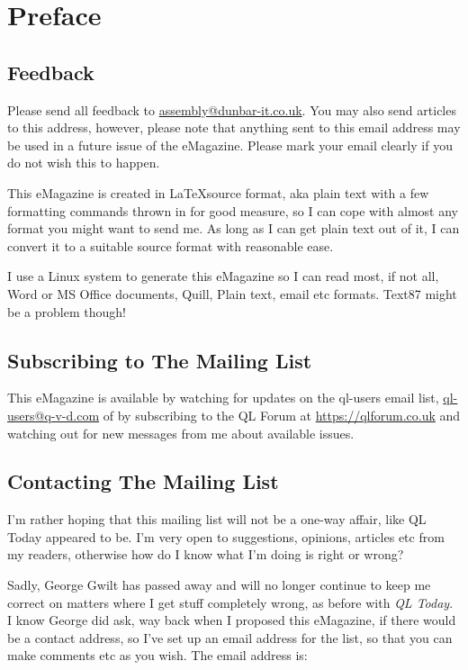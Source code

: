 \chapter{Preface}
\section{Feedback}\label{section: feedback}
Please send all feedback to \url{assembly@dunbar-it.co.uk}. You may also send articles to
this address, however, please note that anything sent to this email address may be used in a future issue of the eMagazine. Please mark your email clearly if you do not wish this to happen.

This eMagazine is created in \LaTeX  source format, aka plain text with a few formatting commands thrown in for good measure, so I can cope with almost any format you might want to send me. As long as I can get plain text out of it, I can convert it to a suitable source format with reasonable ease. 

I use a Linux system to generate this eMagazine so I can read most, if not all, Word or MS Office documents, Quill, Plain text, email etc formats. Text87 might be a problem though!

\section{Subscribing to The Mailing List}
This eMagazine is available by watching for updates on the ql-users email list, \url{ql-users@q-v-d.com} of by subscribing to the QL Forum at \url{https://qlforum.co.uk} and watching out for new messages from me about available issues.

\section{Contacting The Mailing List}
I'm rather hoping that this mailing list will not be a one-way affair, like QL Today appeared to be. I'm very open to suggestions, opinions, articles etc from my readers, otherwise how do I know what I'm doing is right or wrong?

Sadly, George Gwilt has passed away and will no longer continue to keep me correct on matters where I get stuff completely wrong, as before with \emph{QL Today}. I know George did ask, way back when I proposed this eMagazine, if there would be a contact address, so I've set up an email address for the list, so that you can make comments etc as you wish. The email address is:

